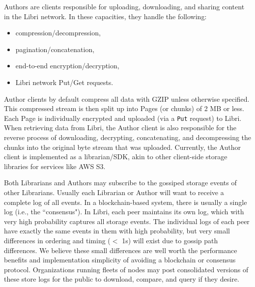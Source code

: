 \documentclass[10pt]{article}
\newcommand{\ttt}[1]{\texttt{#1}}
\def\Put{\ttt{Put}}
\begin{document}
Authors are clients responsible for uploading, downloading, and sharing content in the Libri network. In these capacities, they handle the following:
\begin{itemize}
	\item compression/decompression,
	\item pagination/concatenation,
	\item end-to-end encryption/decryption,
	\item Libri network Put/Get requests.
\end{itemize}

Author clients by default compress all data with GZIP unless otherwise specified. This compressed stream is then split up into Pages (or chunks) of 2 MB or less. Each Page is individually encrypted and uploaded (via a \Put{} request) to Libri. When retrieving data from Libri, the Author client is also responsible for the reverse process of downloading, decrypting, concatenating, and decompressing the chunks into the original byte stream that was uploaded. Currently, the Author client is implemented as a librarian/SDK, akin to other client-side storage libraries for services like AWS S3.

Both Librarians and Authors may subscribe to the gossiped storage events of other Librarians. Usually each Librarian or Author will want to receive a complete log of all events. In a blockchain-based system, there is usually a single log (i.e., the ``consensus"). In Libri, each peer maintains its own log, which with very high probability captures all storage events. The individual logs of each peer have exactly the same events in them with high probability, but very small differences in ordering and timing ($<$ 1s) will exist due to gossip path differences. We believe these small differences are well worth the performance benefits and implementation simplicity of avoiding a blockchain or consensus protocol. Organizations running fleets of nodes may post consolidated versions of these store logs for the public to download, compare, and query if they desire.
\end{document}

